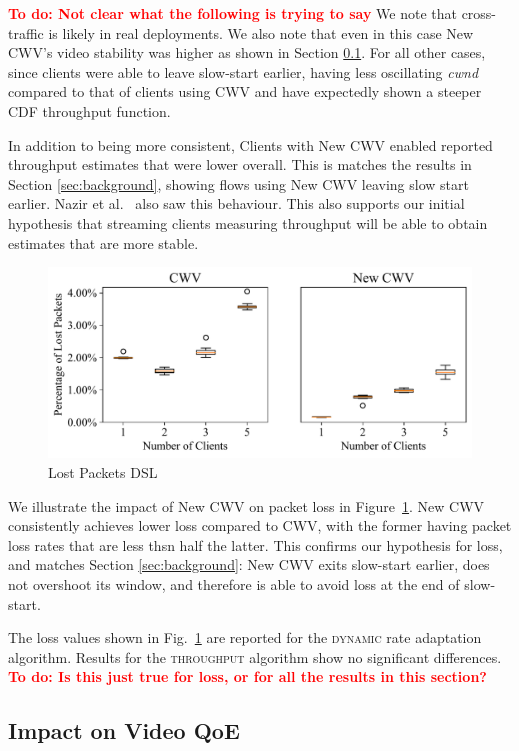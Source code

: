 \documentclass[10pt,sigconf]{acmart}
\newcommand{\todo}[1]{\textbf{\textcolor{red}{To do: #1}}}
\begin{document}
\todo{Not clear what the following is trying to say}
We note that cross-traffic is likely in real deployments. We also note that even in this case New CWV's video stability was higher as shown in Section \ref{sec:QoE-impact}. For all other cases, since clients were able to leave slow-start earlier, having less oscillating \emph{cwnd} compared to that of clients using CWV and have expectedly shown a steeper CDF throughput function. 

In addition to being more consistent, 
Clients with New CWV enabled reported throughput estimates that were lower overall.
This is matches the results in Section \ref{sec:background}, showing flows using New CWV leaving slow start earlier.
Nazir et al.~\cite{Nazir-2014-performance-evaluation-congestion-window-validation-dash-newcwv} also saw this behaviour. This also supports our initial hypothesis that streaming clients measuring throughput will be able to obtain estimates that are more stable. 

\begin{figure}[t!]
  \centering
  \includegraphics[width=.45\textwidth]{figures/lost_packets.pdf}
  \caption{Lost Packets DSL}
  \label{fig:lost-packets}
\end{figure}

We illustrate the impact of New CWV on packet loss in Figure~\ref{fig:lost-packets}. New CWV consistently achieves lower loss compared to CWV, with the former having packet loss rates that are less thsn half the latter. This confirms our hypothesis for loss, and matches Section \ref{sec:background}: New CWV exits slow-start earlier, does not overshoot its window, and therefore is able to avoid loss at the end of slow-start.

The loss values shown in Fig.\ \ref{fig:lost-packets} are reported for the \textsc{dynamic} rate adaptation algorithm. Results for the \textsc{throughput} algorithm show no significant differences.
\todo{Is this just true for loss, or for all the results in this section?}

\subsection{Impact on Video QoE}
\label{sec:QoE-impact}
\end{document}
